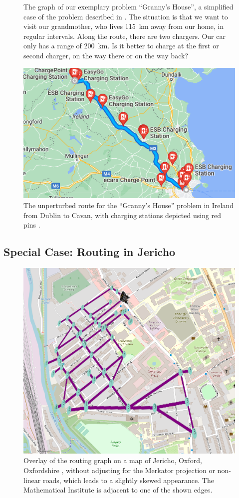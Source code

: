 \documentclass{prettytex/ox/mmsc-special-topic}
\begin{document}
  \begin{figure}[H]
    \centering
    \caption{The graph of our exemplary problem ``Granny's House'', a simplified case of the problem described in . The situation is that we want to visit our grandmother, who lives \SI{115}{\kilo\meter} away from our home, in regular intervals. Along the route, there are two chargers. Our car only has a range of \SI{200}{\kilo\meter}. Is it better to charge at the first or second charger, on the way there or on the way back?}
    \label{fig:grannys-idealised-problem-setting}
  \end{figure}

  \begin{figure}[H]
    \centering
    \includegraphics[width=0.4\linewidth]{figures/grannys-stations.png}
    \caption{The unperturbed route for the ``Granny's House'' problem in Ireland from Dublin to Cavan, with charging stations depicted using red pins \parencite{googlemaps}.}
    \label{fig:grannys-stations}
  \end{figure}

  \subsection{Special Case: Routing in Jericho}
  \begin{figure}[H]
    \centering
    \includegraphics[width=0.45\linewidth]{figures/jericho.png}
    \caption{Overlay of the routing graph on a map of Jericho, Oxford, Oxfordshire \parencite{osm}, without adjusting for the Merkator projection or non-linear roads, which leads to a slightly skewed appearance. The Mathematical Institute is adjacent to one of the shown edges.}
    \label{fig:jericho}
  \end{figure}
\end{document}
